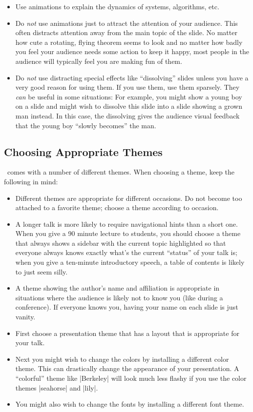 \begin{itemize}
\item
  Use animations to explain the dynamics of systems, algorithms, etc.
\item
  Do \emph{not} use animations just to attract the attention of your audience. This often distracts attention away from the main topic of the slide. No matter how cute a rotating, flying theorem seems to look and no matter how badly you feel your audience needs some action to keep it happy, most people in the audience will typically feel you are making fun of them.
\item
  Do \emph{not} use distracting special effects like ``dissolving'' slides unless you have a very good reason for using them. If you use them, use them sparsely. They \emph{can} be useful in some situations: For example, you might show a young boy on a slide and might wish to dissolve this slide into a slide showing a grown man instead. In this case, the dissolving  gives the audience visual feedback that the young boy ``slowly becomes'' the man.
\end{itemize}


\subsection{Choosing Appropriate Themes}

\beamer\ comes with a number of different themes. When choosing a theme, keep the following in mind:
\begin{itemize}
\item
  Different themes are appropriate for different occasions. Do not become too attached to a favorite theme; choose a theme according to occasion.
\item
  A longer talk is more likely to require navigational hints than a short one. When you give a 90 minute lecture to students, you should choose a theme that always shows a sidebar with the current topic highlighted so that everyone always knows exactly what's the current ``status'' of your talk is; when you give a ten-minute introductory speech, a table of contents is likely to just seem silly.
\item
  A theme showing the author's name and affiliation is appropriate in situations where the audience is likely not to know you (like during a conference). If everyone knows you, having your name on each slide is just vanity.
\item
  First choose a presentation theme that has a layout that is appropriate for your talk.
\item
  Next you might wish to change the colors by installing a different color theme. This can drastically change the appearance of your presentation. A ``colorful'' theme like |Berkeley| will look much less flashy if you use the color themes |seahorse| and |lily|.
\item
  You might also wish to change the fonts by installing a different font theme.
\end{itemize}


